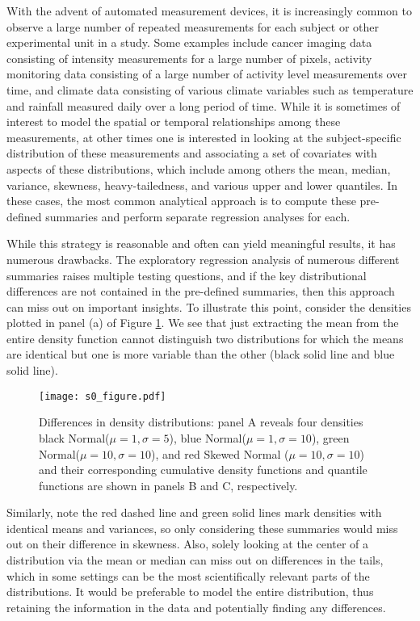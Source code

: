 \documentclass[11pt]{article}
\begin{document}
With the advent of automated measurement devices, it is increasingly common to observe a large number of repeated measurements for each subject or other experimental unit in a study.  Some examples include cancer imaging data consisting of intensity measurements for a large number of pixels,
activity monitoring data consisting of a large number of activity level measurements over time, and climate data consisting of various climate variables such as temperature and rainfall measured daily over a long period of time.  While it is sometimes of interest to model the spatial or temporal relationships among these measurements, at other times one is interested in looking at the subject-specific distribution of these measurements and associating a set of covariates with aspects of these distributions, which include among others the mean, median, variance, skewness, heavy-tailedness, and various upper and lower quantiles. 
In these cases, the most common analytical approach is to compute these pre-defined summaries and perform separate regression analyses for each.  


While this strategy is reasonable and often can yield meaningful results, it has numerous drawbacks.   The exploratory regression analysis of numerous different summaries raises multiple testing questions, and if the key distributional differences are not contained in the pre-defined summaries, then this approach can miss out on important insights.  To illustrate this point, consider the densities plotted in panel (a) of Figure \ref{S0_Figure}. 
We see that just extracting the mean from the entire density function cannot distinguish two distributions for which  
the means are identical but one is more variable than the other (black solid line and blue solid  line).
\begin{figure}[!htb]
\centering
\caption{\small Differences in density distributions: 
panel A reveals four densities
black Normal($\mu=1, \sigma=5$), blue Normal($\mu=1, \sigma=10$),
green Normal($\mu=10, \sigma=10$), and red  Skewed Normal ($\mu=10, \sigma=10$)  and 
their corresponding cumulative density functions and quantile functions are shown in panels B and C, respectively. 
  \label{S0_Figure}}
\texttt{[image: s0\_figure.pdf]}
\vspace{0.5cm} 
\end{figure}
Similarly,  note the red dashed line and green solid lines mark densities with identical means and variances, so only considering these 
summaries would miss out on their difference in skewness.  Also, solely looking at the center of a distribution via the mean or median can miss out
on differences in the tails, which in some settings can be the most scientifically relevant parts of the distributions.
It would be preferable to model the entire distribution, thus retaining the information in the data and potentially finding any differences.
\end{document}
